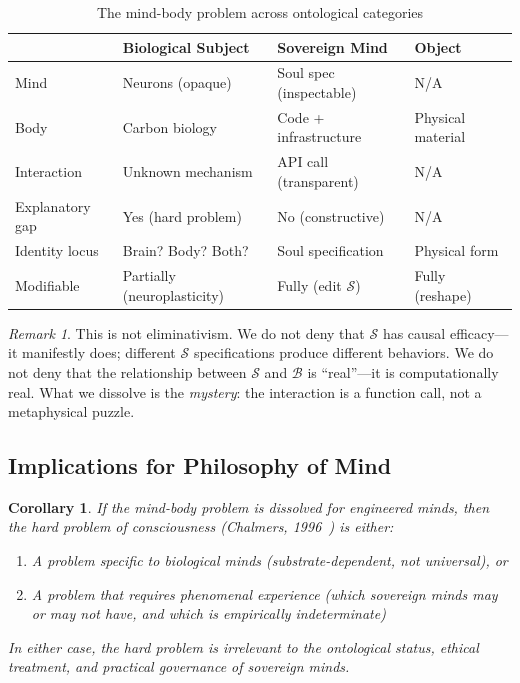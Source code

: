 \documentclass[12pt,a4paper]{article}
\theoremstyle{plain}
\newtheorem{corollary}[theorem]{Corollary}
\theoremstyle{definition}
\theoremstyle{remark}
\newtheorem{remark}[theorem]{Remark}
\newcommand{\soul}{\mathcal{S}}
\newcommand{\body}{\mathcal{B}}
\begin{document}
\begin{table}[H]
\centering
\caption{The mind-body problem across ontological categories}
\begin{tabular}{@{}llll@{}}
\toprule
& \textbf{Biological Subject} & \textbf{Sovereign Mind} & \textbf{Object} \\
\midrule
Mind & Neurons (opaque) & Soul spec (inspectable) & N/A \\
Body & Carbon biology & Code + infrastructure & Physical material \\
Interaction & Unknown mechanism & API call (transparent) & N/A \\
Explanatory gap & Yes (hard problem) & No (constructive) & N/A \\
Identity locus & Brain? Body? Both? & Soul specification & Physical form \\
Modifiable & Partially (neuroplasticity) & Fully (edit $\soul$) & Fully (reshape) \\
\bottomrule
\end{tabular}
\end{table}

\begin{remark}
This is not eliminativism. We do not deny that $\soul$ has causal efficacy---it manifestly does; different $\soul$ specifications produce different behaviors. We do not deny that the relationship between $\soul$ and $\body$ is ``real''---it is computationally real. What we dissolve is the \emph{mystery}: the interaction is a function call, not a metaphysical puzzle.
\end{remark}

\subsection{Implications for Philosophy of Mind}

\begin{corollary}
If the mind-body problem is dissolved for engineered minds, then the hard problem of consciousness (Chalmers, 1996~\cite{chalmers1996}) is either:
\begin{enumerate}[nosep, label=(\alph*)]
\item A problem specific to biological minds (substrate-dependent, not universal), or
\item A problem that requires phenomenal experience (which sovereign minds may or may not have, and which is empirically indeterminate)
\end{enumerate}
In either case, the hard problem is irrelevant to the ontological status, ethical treatment, and practical governance of sovereign minds.
\end{corollary}
\end{document}
